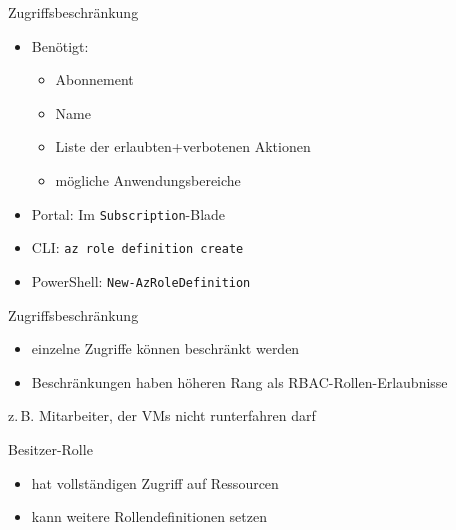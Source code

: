 

\begin{flashcard}[Definition]{Zugriffsbeschränkung}
    \begin{itemize}
        \item Benötigt:
            \begin{itemize}
                \item Abonnement
                \item Name
                \item Liste der erlaubten+verbotenen Aktionen
                \item mögliche Anwendungsbereiche
            \end{itemize}
        \item Portal: Im \texttt{Subscription}-Blade
        \item CLI: \texttt{az role definition create}
        \item PowerShell: \texttt{New-AzRoleDefinition}
    \end{itemize}
\end{flashcard}


\begin{flashcard}[Definition]{Zugriffsbeschränkung}
    \begin{itemize}
        \item einzelne Zugriffe können beschränkt werden
        \item Beschränkungen haben höheren Rang als RBAC-Rollen-Erlaubnisse
    \end{itemize}
    \vspace{1cm}
    z.\,B. Mitarbeiter, der VMs nicht runterfahren darf
\end{flashcard}

\begin{flashcard}[Definition]{Besitzer-Rolle}
    \begin{itemize}
        \item hat vollständigen Zugriff auf Ressourcen
        \item kann weitere Rollendefinitionen setzen
    \end{itemize}
\end{flashcard}

